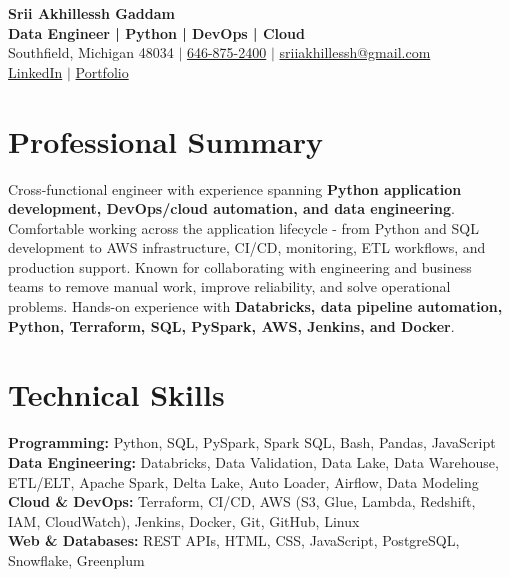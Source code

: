 \documentclass[letterpaper,10pt]{article}
\begin{document}
\fontsize{9.35pt}{10.45pt}\selectfont

\begin{center}
    {\LARGE \textbf{Srii Akhillessh Gaddam}} \\[-1pt]
    \textbf{Data Engineer | Python | DevOps | Cloud} \\[2pt]
    Southfield, Michigan 48034 $|$
    \href{tel:6468752400}{646-875-2400} $|$
    \href{mailto:sriiakhillessh@gmail.com}{sriiakhillessh@gmail.com} \\[1pt]
    \href{https://www.linkedin.com/in/srii-akhiilessh-gaddam-b48668191/}{LinkedIn} $|$
    \href{https://sriiakhillesshg.github.io/portfolio/}{Portfolio}
\end{center}
\vspace{-8pt}

\section{Professional Summary}
\small{Cross-functional engineer with experience spanning \textbf{Python application development, DevOps/cloud automation, and data engineering}. Comfortable working across the application lifecycle - from Python and SQL development to AWS infrastructure, CI/CD, monitoring, ETL workflows, and production support. Known for collaborating with engineering and business teams to remove manual work, improve reliability, and solve operational problems. Hands-on experience with \textbf{Databricks, data pipeline automation, Python, Terraform, SQL, PySpark, AWS, Jenkins, and Docker}.}

\section{Technical Skills}
\small{
\textbf{Programming:} Python, SQL, PySpark, Spark SQL, Bash, Pandas, JavaScript \\
\textbf{Data Engineering:} Databricks, Data Validation, Data Lake, Data Warehouse, ETL/ELT, Apache Spark, Delta Lake, Auto Loader, Airflow, Data Modeling \\
\textbf{Cloud \& DevOps:} Terraform, CI/CD, AWS (S3, Glue, Lambda, Redshift, IAM, CloudWatch), Jenkins, Docker, Git, GitHub, Linux \\
\textbf{Web \& Databases:} REST APIs, HTML, CSS, JavaScript, PostgreSQL, Snowflake, Greenplum
}
\end{document}
